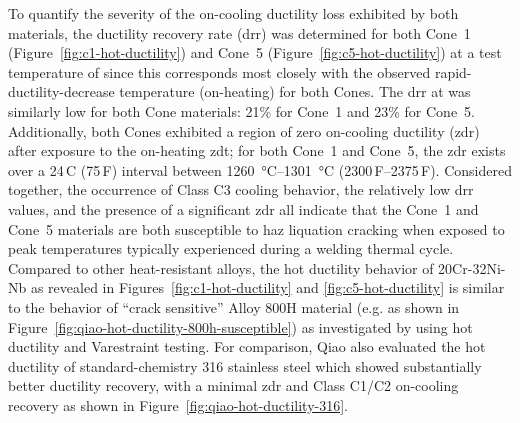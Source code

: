 {To quantify the severity of the on-cooling ductility loss exhibited by both materials, the ductility recovery rate (\gls{drr}) was determined for both Cone~1 (Figure~\ref{fig:c1-hot-ductility}) and Cone~5 (Figure~\ref{fig:c5-hot-ductility}) at a test temperature of  since this corresponds most closely with the observed rapid-ductility-decrease temperature (on-heating) for both Cones.  The \gls{drr} at  was similarly low for both Cone materials: 21\% for Cone~1 and 23\% for Cone~5.  Additionally, both Cones exhibited a region of zero on-cooling ductility (\gls{zdr}) after exposure to the on-heating \gls{zdt}; for both Cone~1 and Cone~5, the \gls{zdr} exists over a 24\,C\textdegree{} (75\,F\textdegree{}) interval between \SIrange[range-phrase=--]{1260}{1301}{\degreeCelsius} (2300\,\textdegree{}F--2375\,\textdegree{}F).  Considered together, the occurrence of Class C3 cooling behavior, the relatively low \gls{drr} values, and the presence of a significant \gls{zdr} all indicate that the Cone~1 and Cone~5 materials are both susceptible to \gls{haz} liquation cracking when exposed to peak temperatures typically experienced during a welding thermal cycle. Compared to other heat-resistant alloys, the hot ductility behavior of 20Cr-32Ni-Nb as revealed in Figures~\ref{fig:c1-hot-ductility} and \ref{fig:c5-hot-ductility} is similar to the behavior of ``crack sensitive'' Alloy 800H material (e.g. as shown in Figure~\ref{fig:qiao-hot-ductility-800h-susceptible}) as investigated by \citet{qiao_weldability_1993} using hot ductility and Varestraint testing. For comparison, Qiao also evaluated the hot ductility of standard-chemistry 316 stainless steel which showed substantially better ductility recovery, with a minimal \gls{zdr} and Class C1/C2 on-cooling recovery as shown in Figure~\ref{fig:qiao-hot-ductility-316}.

}
